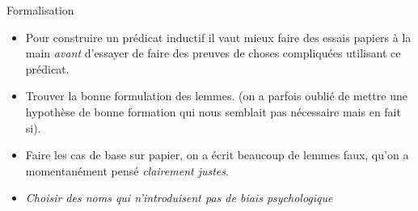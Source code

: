 \documentclass{beamer}
\begin{document}
\begin{frame}{Formalisation}
\begin{itemize}
\item Pour construire un prédicat inductif il vaut mieux faire des essais
papiers à la main \emph{avant} d'essayer de faire des preuves de choses
compliquées utilisant ce prédicat.
\pause
\item Trouver la bonne formulation des lemmes. (on a parfois oublié de mettre une
hypothèse de bonne formation qui nous semblait pas nécessaire mais en
fait si).
\pause
\item Faire les cas de base sur papier, on a écrit beaucoup de lemmes
faux, qu'on a momentanément pensé \emph{clairement justes}.
\pause
\item \emph{Choisir des noms qui n'introduisent pas de biais
psychologique}
\end{itemize}
\end{frame}
%
%
\end{document}
